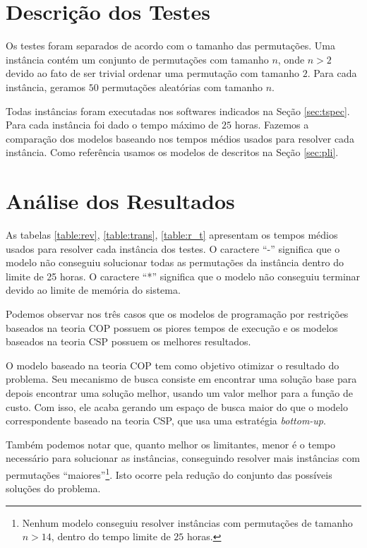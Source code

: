 \section{Descrição dos Testes}
\label{sec:testes}
Os testes foram separados de acordo com o tamanho das permutações. Uma
instância contém um conjunto de permutações com tamanho $n$, onde $n >
2$ devido ao fato de ser trivial ordenar uma permutação com tamanho
$2$. Para cada instância, geramos $50$ permutações aleatórias com
tamanho $n$.

Todas instâncias foram executadas nos softwares indicados na
Seção \ref{sec:tspec}. Para cada instância foi dado o tempo máximo de
$25$ horas. Fazemos a comparação dos modelos baseando nos tempos
médios usados para resolver cada instância. Como referência usamos os
modelos de \pli{} descritos na Seção \ref{sec:pli}.

\section{Análise dos Resultados}
\label{sec:analise}
As tabelas \ref{table:rev}, \ref{table:trans}, \ref{table:r_t}
apresentam os tempos médios usados para resolver cada instância dos
testes. O caractere ``-'' significa que o modelo não conseguiu
solucionar todas as permutações da instância dentro do limite de 25
horas. O caractere ``*'' significa que o modelo não conseguiu terminar
devido ao limite de memória do sistema.

Podemos observar nos três casos que os modelos de programação por
restrições baseados na teoria COP possuem os piores tempos de execução
e os modelos baseados na teoria CSP possuem os melhores resultados.

O modelo baseado na teoria COP tem como objetivo otimizar o resultado
do problema. Seu mecanismo de busca consiste em encontrar uma solução
base para depois encontrar uma solução melhor, usando um valor melhor
para a função de custo. Com isso, ele acaba gerando um espaço de busca
maior do que o modelo correspondente baseado na teoria CSP, que usa
uma estratégia \textit{bottom-up}.

Também podemos notar que, quanto melhor os limitantes, menor é o tempo
necessário para solucionar as instâncias, conseguindo resolver mais
instâncias com permutações ``maiores''\footnote{Nenhum modelo
conseguiu resolver instâncias com permutações de tamanho $n > 14$,
dentro do tempo limite de $25$ horas.}. Isto ocorre pela redução do
conjunto das possíveis soluções do problema.

